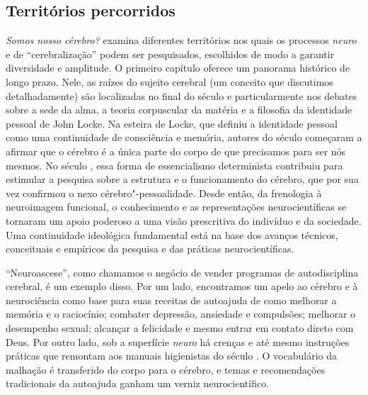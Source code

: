 \subsection{Territórios percorridos}

\emph{Somos nosso cérebro?} examina diferentes territórios nos quais os
processos \emph{neuro} e de ``cerebralização'' podem ser pesquisados,
escolhidos de modo a garantir diversidade e amplitude. O primeiro
capítulo oferece um panorama histórico de longo prazo. Nele, as raízes
do sujeito cerebral (um conceito que discutimos detalhadamente) são
localizadas no final do século  e particularmente nos debates sobre
a sede da alma, a teoria corpuscular da matéria e a filosofia da
identidade pessoal de John Locke. Na esteira de Locke, que definiu a
identidade pessoal como uma continuidade de consciência e memória,
autores do século  começaram a afirmar que o cérebro é a única
parte do corpo de que precisamos para ser nós mesmos. No século ,
essa forma de essencialismo determinista contribuiu para estimular a
pesquisa sobre a estrutura e o funcionamento do cérebro, que por sua vez
confirmou o nexo cérebro"-pessoalidade. Desde então, da frenologia à
neuroimagem funcional, o conhecimento e as representações
neurocientíficas se tornaram um apoio poderoso a uma visão prescritiva
do indivíduo e da sociedade. Uma continuidade ideológica fundamental
está na base dos avanços técnicos, conceituais e empíricos da pesquisa e
das práticas neurocientíficas.

``Neuroascese'', como chamamos o negócio de vender programas de
autodisciplina cerebral, é um exemplo disso. Por um lado, encontramos um
apelo ao cérebro e à neurociência como base para suas receitas de
autoajuda de como melhorar a memória e o raciocínio; combater depressão,
ansiedade e compulsões; melhorar o desempenho sexual; alcançar a
felicidade e mesmo entrar em contato direto com Deus. Por outro lado,
sob a superfície \emph{neuro} há crenças e até mesmo instruções práticas
que remontam aos manuais higienistas do século . O vocabulário da
malhação é transferido do corpo para o cérebro, e temas e recomendações
tradicionais da autoajuda ganham um verniz neurocientífico.

